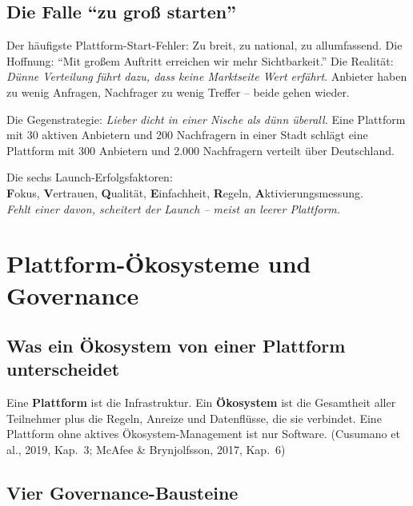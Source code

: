 \documentclass[11pt,a4paper,oneside]{article}
\newcommand{\caveatfontfallback}{\itshape}
\newcommand\caveatfont{\caveatfontfallback}%
\newcommand{\akzent}[1]{{\caveatfont\color{lpAmber}#1}}
\newcommand{\fachbegriff}[1]{\textbf{#1}}
\newcommand{\quelle}[1]{{\footnotesize\color{lpGray}(#1)}}
\begin{document}
\subsection{Die Falle ``zu groß starten''}

Der häufigste Plattform-Start-Fehler: Zu breit, zu national, zu allumfassend. Die Hoffnung: ``Mit großem Auftritt erreichen wir mehr Sichtbarkeit.'' Die Realität: \emph{Dünne Verteilung führt dazu, dass keine Marktseite Wert erfährt}. Anbieter haben zu wenig Anfragen, Nachfrager zu wenig Treffer -- beide gehen wieder.

Die Gegenstrategie: \emph{Lieber dicht in einer Nische als dünn überall.} Eine Plattform mit 30 aktiven Anbietern und 200 Nachfragern in einer Stadt schlägt eine Plattform mit 300 Anbietern und 2.000 Nachfragern verteilt über Deutschland.

\begin{eselsbox}[Eselsbrücke: \akzent{F-V-Q-E-R-A}]
Die sechs Launch-Erfolgsfaktoren:\\[2pt]
\textbf{F}okus, \textbf{V}ertrauen, \textbf{Q}ualität, \textbf{E}infachheit, \textbf{R}egeln, \textbf{A}ktivierungsmessung.\\[2pt]
\emph{Fehlt einer davon, scheitert der Launch -- meist an leerer Plattform.}
\end{eselsbox}

\section{Plattform-Ökosysteme und Governance}

\subsection{Was ein Ökosystem von einer Plattform unterscheidet}

Eine \fachbegriff{Plattform} ist die Infrastruktur. Ein \fachbegriff{Ökosystem} ist die Gesamtheit aller Teilnehmer plus die Regeln, Anreize und Datenflüsse, die sie verbindet. Eine Plattform ohne aktives Ökosystem-Management ist nur Software. \quelle{Cusumano et al., 2019, Kap.~3; McAfee \& Brynjolfsson, 2017, Kap.~6}

\subsection{Vier Governance-Bausteine}
\end{document}
